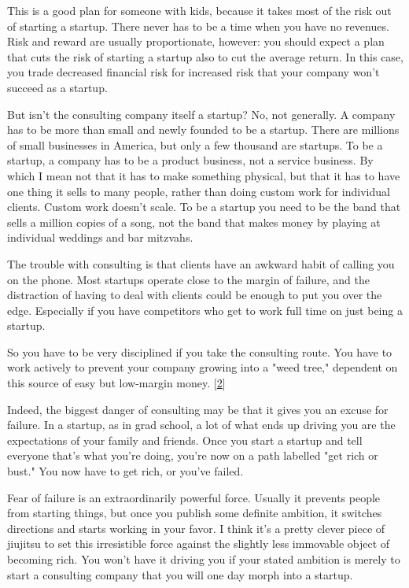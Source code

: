 This is a good plan for someone with kids, because it takes most
of the risk out of starting a startup.  There never has to be a
time when you have no revenues.  Risk and reward are usually
proportionate, however: you should expect a plan that cuts the risk
of starting a startup also to cut the average return.  In this case,
you trade decreased financial risk for increased risk that your
company won't succeed as a startup.

But isn't the consulting company itself a startup?  No, not generally.
A company has to be more than small and newly founded to be a
startup.  There are millions of small businesses in America, but
only a few thousand are startups.  To be a startup, a company has
to be a product business, not a service business.  By which I mean
not that it has to make something physical, but that it has to have
one thing it sells to many people, rather than doing custom work
for individual clients.  Custom work doesn't scale.  To be a startup
you need to be the band that sells a million copies of a song, not
the band that makes money by playing at individual weddings and bar
mitzvahs.

The trouble with consulting is that clients have an awkward habit
of calling you on the phone.  Most startups operate close to the
margin of failure, and the distraction of having to deal with clients
could be enough to put you over the edge.  Especially if you have
competitors who get to work full time on just being a startup.

So you have to be very disciplined if you take the consulting route.
You have to work actively to prevent your company growing into a
"weed tree," dependent on this source of easy but low-margin money.
[\href{\#f2n}{2}]

Indeed, the biggest danger of consulting may be that it gives you
an excuse for failure.  In a startup, as in grad school, a lot of
what ends up driving you are the expectations of your family and
friends.  Once you start a startup and tell everyone that's what
you're doing, you're now on a path labelled "get rich or bust." You
now have to get rich, or you've failed.

Fear of failure is an extraordinarily powerful force.  Usually it
prevents people from starting things, but once you publish some
definite ambition, it switches directions and starts working in
your favor.  I think it's a pretty clever piece of jiujitsu to set
this irresistible force against the slightly less immovable object
of becoming rich.  You won't have it driving you if your stated
ambition is merely to start a consulting company that you will one
day morph into a startup.


